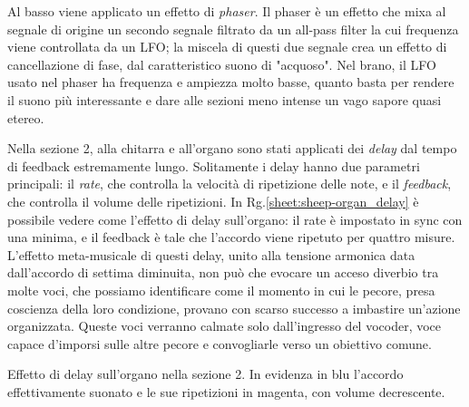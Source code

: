 \documentclass[class=book, crop=false, oneside, 12pt]{standalone}
\begin{document}
    Al basso viene applicato un effetto di \emph{phaser}. Il phaser è un effetto che mixa al segnale di origine un secondo segnale filtrato da un all-pass filter la cui frequenza viene controllata da un LFO; la miscela di questi due segnale crea un effetto di cancellazione di fase, dal caratteristico suono di "acquoso". Nel brano, il LFO usato nel phaser ha frequenza e ampiezza molto basse, quanto basta per rendere il suono più interessante e dare alle sezioni meno intense un vago sapore quasi etereo.

    Nella sezione 2, alla chitarra e all'organo sono stati applicati dei \emph{delay} dal tempo di feedback estremamente lungo. Solitamente i delay hanno due parametri principali: il \emph{rate}, che controlla la velocità di ripetizione delle note, e il \emph{feedback}, che controlla il volume delle ripetizioni. In Rg.\ref{sheet:sheep-organ_delay} è possibile vedere come l'effetto di delay sull'organo: il rate è impostato in sync con una minima, e il feedback è tale che l'accordo viene ripetuto per quattro misure. L'effetto meta-musicale di questi delay, unito alla tensione armonica data dall'accordo di settima diminuita, non può che evocare un acceso diverbio tra molte voci, che possiamo identificare come il momento in cui le pecore, presa coscienza della loro condizione, provano con scarso successo a imbastire un'azione organizzata. Queste voci verranno calmate solo dall'ingresso del vocoder, voce capace d'imporsi sulle altre pecore e convogliarle verso un obiettivo comune.

    \begin{sheet}[htb]
        \centering
        \caption[Effetto di delay sull'organo.]{Effetto di delay sull'organo nella sezione 2. In evidenza in blu l'accordo effettivamente suonato  e le sue ripetizioni in magenta, con volume decrescente.}
        \label{sheet:sheep-organ_delay}
    \end{sheet}


\end{document}
